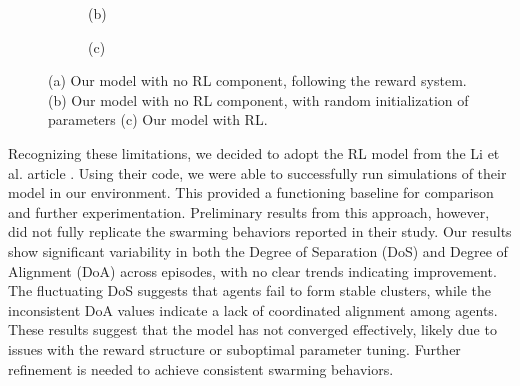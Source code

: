 \documentclass[9pt]{pnas-new}
\begin{document}
\begin{figure}[ht]
\begin{subfigure}{0.30\textwidth}
		\vspace{0.5em}
		\centering (b)
	\end{subfigure}
	\hfill
	\begin{subfigure}{0.30\textwidth}
		\centering
		\vspace{0.5em}
		\centering (c)
	\end{subfigure}
	
	\caption{(a) Our model with no RL component, following the reward system. (b) Our model with no RL component, with random initialization of parameters (c) Our model with RL.}
	\label{fig:three_images}
\end{figure}

Recognizing these limitations, we decided to adopt the RL model from the Li et al. article \cite{li2023predator}.
Using their code, we were able to successfully run simulations of their model in our environment. 
This provided a functioning baseline for comparison and further experimentation.
Preliminary results from this approach, however, did not fully replicate the swarming behaviors reported in their study.
Our results show significant variability in both the Degree of Separation (DoS) and Degree of Alignment (DoA) across episodes, with no clear trends indicating improvement. 
The fluctuating DoS suggests that agents fail to form stable clusters, while the inconsistent DoA values indicate a lack of coordinated alignment among agents. 
These results suggest that the model has not converged effectively, likely due to issues with the reward structure or suboptimal parameter tuning. 
Further refinement is needed to achieve consistent swarming behaviors.
\end{document}

